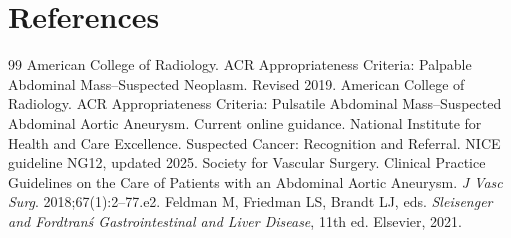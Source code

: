 \section*{References}
\begin{thebibliography}{99}
 American College of Radiology. ACR Appropriateness Criteria: Palpable Abdominal Mass--Suspected Neoplasm. Revised 2019.
 American College of Radiology. ACR Appropriateness Criteria: Pulsatile Abdominal Mass--Suspected Abdominal Aortic Aneurysm. Current online guidance.
 National Institute for Health and Care Excellence. Suspected Cancer: Recognition and Referral. NICE guideline NG12, updated 2025.
 Society for Vascular Surgery. Clinical Practice Guidelines on the Care of Patients with an Abdominal Aortic Aneurysm. \textit{J Vasc Surg}. 2018;67(1):2--77.e2.
 Feldman M, Friedman LS, Brandt LJ, eds. \textit{Sleisenger and Fordtran\'s Gastrointestinal and Liver Disease}, 11th ed. Elsevier, 2021.
\end{thebibliography}
